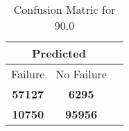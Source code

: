 \begin{table}[] 
\caption{Confusion Matric for 90.0} 
\label{Table: Prediction Accuracy-None90.0DecisionTrees100EKF-ignoresolarPanelDipole-solarPanelDipole} 
\centering 
\begin{tabular} 
 {@{}ccc@{}} 
\toprule 
\multicolumn{2}{c}{\textbf{Predicted}}
 \\ \midrule 
\multicolumn{1}{|c|}{Failure} & 
\multicolumn{1}{c|}{No Failure}
 \\ \midrule 
\multicolumn{1}{|c|}{\color{green}\textbf{57127}} & 
\multicolumn{1}{c|}{\color{red}\textbf{6295}}
 \\ \midrule 
\multicolumn{1}{|c|}{\color{red}\textbf{10750}} & 
\multicolumn{1}{c|}{\color{green}\textbf{95956}}
 \\ \bottomrule 
\end{tabular} 
\end{table} 
